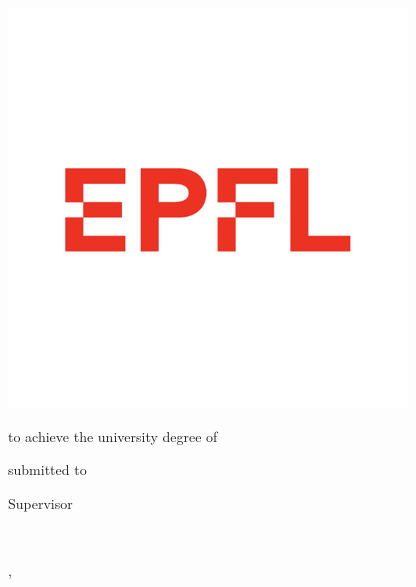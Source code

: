 
\begin{titlepage}

{\sffamily

\begin{center}

\includegraphics[width=.5\textwidth]{figures/EPFL.png}

\vfill\vfill\vfill
\vfill\vfill\vfill

\myauthorwithexistingtitles

\vfill\vfill\vfill

{\LARGE\bfseries\mytitle}

{\large\bfseries\mysubtitle}

\vfill\vfill\vfill
\vfill\vfill\vfill

{\bfseries\large\myworktitle}

to achieve the university degree of

\mygrade



\vfill\vfill\vfill


submitted to

\vfill

{\bfseries\large\myuniversity}


\vfill\vfill\vfill


Supervisor

\mysupervisor

\vfill

\myinstitute\\

\vfill



\vfill\vfill\vfill


\mysubmissiontown, \mysubmissionmonth~\mysubmissionyear

\end{center}
}%
\end{titlepage}

